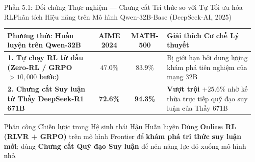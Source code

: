 \begin{frame}{Phần 5.1: Đối chứng Thực nghiệm --- Chưng cất Tri thức so với Tự Tối ưu hóa RL}{Phân tích Hiệu năng trên Mô hình Qwen-32B-Base (DeepSeek-AI, 2025)}
  \vspace{0.06cm}
  \footnotesize
  \renewcommand{\arraystretch}{1.28}
  \begin{tabularx}{\textwidth}{@{}p{4.8cm} c c X@{}}
    \toprule
    \textbf{Phương thức Huấn luyện trên Qwen-32B} & \textbf{AIME 2024} & \textbf{MATH-500} & \textbf{Giải thích Cơ chế Lý thuyết} \\
    \midrule
    \textbf{1. Tự chạy RL từ đầu (Zero-RL / GRPO $>10{,}000$ bước)} & $47.0\%$ & $83.9\%$ & Bị giới hạn bởi dung lượng khám phá tiên nghiệm của mạng 32B \\
    \hline
    \textbf{2. Chưng cất Suy luận từ Thầy DeepSeek-R1 671B} & \textbf{\textcolor{tealgreen}{72.6\%}} & \textbf{\textcolor{tealgreen}{94.3\%}} & \textbf{Vượt trội $+25.6\%$} nhờ kế thừa trực tiếp quỹ đạo suy luận của Thầy 671B \\
    \bottomrule
  \end{tabularx}

  \vspace{0.12cm}
  \begin{exampleblock}{Phân công Chiến lược trong Hệ sinh thái Hậu Huấn luyện}
    \footnotesize
    Dùng \textbf{Online RL (RLVR + GRPO)} trên mô hình Frontier để \textbf{khám phá tri thức suy luận mới}; dùng \textbf{Chưng cất Quỹ đạo Suy luận} để nén năng lực đó xuống mô hình nhỏ.
  \end{exampleblock}
\end{frame}

